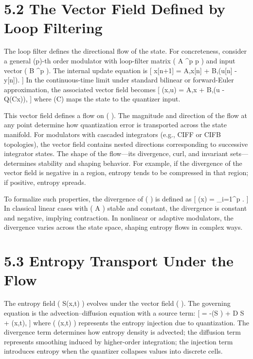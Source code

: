 \section*{5.2 The Vector Field Defined by Loop Filtering}

The loop filter defines the directional flow of the state. For concreteness, consider a general (p)-th order modulator with loop-filter matrix ( A \in {}^{p \times p} ) and input vector ( B \in {}^p ). The internal update equation is
[
x[n+1] = A,x[n] + B,(u[n] - y[n]).
]
In the continuous-time limit under standard bilinear or forward-Euler approximation, the associated vector field becomes
[
(x,u) = A,x + B,(u - Q(Cx)),
]
where (C) maps the state to the quantizer input.

This vector field defines a flow on (  ). The magnitude and direction of the flow at any point determine how quantization error is transported across the state manifold. For modulators with cascaded integrators (e.g., CIFF or CIFB topologies), the vector field contains nested directions corresponding to successive integrator states. The shape of the flow—its divergence, curl, and invariant sets—determines stability and shaping behavior. For example, if the divergence of the vector field is negative in a region, entropy tends to be compressed in that region; if positive, entropy spreads.

To formalize such properties, the divergence of (  ) is defined as
[
\nabla \cdot {}(x) = \sum_{i=1}^{p} .
]
In classical linear cases with ( A ) stable and constant, the divergence is constant and negative, implying contraction. In nonlinear or adaptive modulators, the divergence varies across the state space, shaping entropy flows in complex ways.

\section*{5.3 Entropy Transport Under the Flow}

The entropy field ( S(x,t) ) evolves under the vector field (  ). The governing equation is the advection–diffusion equation with a source term:
[
 = -\nabla \cdot (S ) + D \Delta S + \sigma(x,t),
]
where ( \sigma(x,t) ) represents the entropy injection due to quantization. The divergence term determines how entropy density is advected; the diffusion term represents smoothing induced by higher-order integration; the injection term introduces entropy when the quantizer collapses values into discrete cells.

